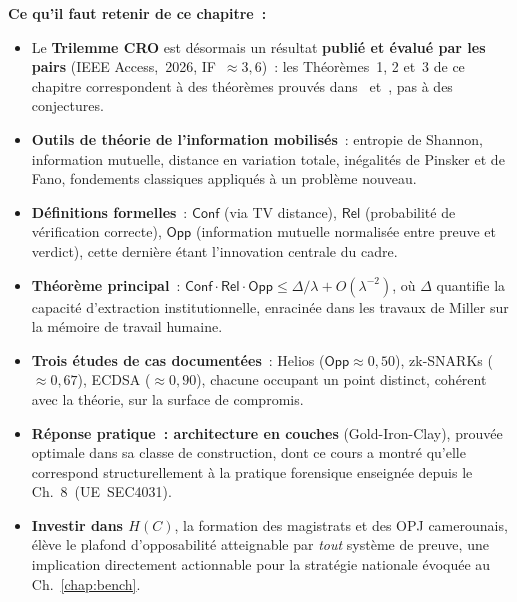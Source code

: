 \separateur

\begin{boxresume}
\textbf{Ce qu'il faut retenir de ce chapitre~:}
\begin{itemize}
    \item Le \textbf{Trilemme CRO} est désormais un résultat
          \textbf{publié et évalué par les pairs}
          (IEEE Access,~2026, IF~$\approx 3{,}6$)~: les
          Théorèmes~1, 2 et~3 de ce chapitre correspondent à des
          théorèmes prouvés dans~\cite{minka2026clo}
          et~\cite{minka2026conditional}, pas à des conjectures.

    \item \textbf{Outils de théorie de l'information mobilisés}~:
          entropie de Shannon, information mutuelle, distance en
          variation totale, inégalités de Pinsker et de Fano, fondements classiques appliqués à un problème nouveau.

    \item \textbf{Définitions formelles}~: $\mathsf{Conf}$ (via TV
          distance), $\mathsf{Rel}$ (probabilité de vérification
          correcte), $\mathsf{Opp}$ (information mutuelle normalisée
          entre preuve et verdict), cette dernière étant
          l'innovation centrale du cadre.

    \item \textbf{Théorème principal}~: $\mathsf{Conf} \cdot
          \mathsf{Rel} \cdot \mathsf{Opp} \leq \Delta/\lambda +
          O(\lambda^{-2})$, où $\Delta$ quantifie la capacité
          d'extraction institutionnelle, enracinée dans les travaux
          de Miller sur la mémoire de travail humaine.

    \item \textbf{Trois études de cas documentées}~: Helios
          ($\mathsf{Opp}\approx 0{,}50$), zk-SNARKs
          ($\approx 0{,}67$), ECDSA ($\approx 0{,}90$),
          chacune occupant un point distinct, cohérent avec la
          théorie, sur la surface de compromis.

    \item \textbf{Réponse pratique~: architecture en couches}
          (Gold-Iron-Clay), prouvée optimale dans sa classe de
          construction, dont ce cours a montré qu'elle correspond
          structurellement à la pratique forensique enseignée
          depuis le Ch.~8~(UE~SEC4031).

    \item \textbf{Investir dans $H(C)$}, la formation des
          magistrats et des OPJ camerounais, élève le plafond
          d'opposabilité atteignable par \emph{tout} système de
          preuve, une implication directement actionnable pour
          la stratégie nationale évoquée au Ch.~\ref{chap:bench}.
\end{itemize}
\end{boxresume}

